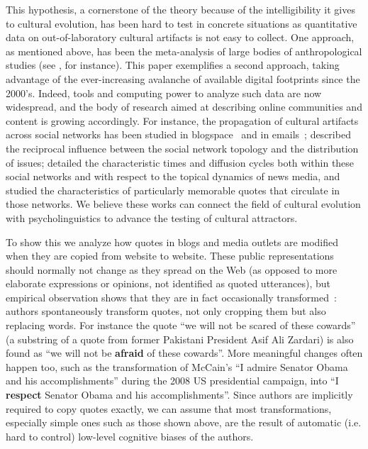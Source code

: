 \begin{new}
This hypothesis, a cornerstone of the theory because of the intelligibility it gives to cultural evolution, has been hard to test in concrete situations as quantitative data on out-of-laboratory cultural artifacts is not easy to collect.
One approach, as mentioned above, has been the meta-analysis of large bodies of anthropological studies (see \citealp{miton_universal_2015}, for instance).
This paper exemplifies a second approach, taking advantage of the ever-increasing avalanche of available digital footprints since the 2000's.
Indeed, tools and computing power to analyze such data are now widespread, and the body of research aimed at describing online communities and content is growing accordingly.
For instance, the propagation of cultural artifacts across social networks has been studied in blogspace~\citep{gruhl_information_2004} and in emails~\citep{liben-nowell_tracing_2008};
\citet{cointet_socio-semantic_2009} described the reciprocal influence between the social network topology and the distribution of issues;
\citet{leskovec_meme-tracking_2009} detailed the characteristic times and diffusion cycles both within these social networks and with respect to the topical dynamics of news media, and \citet{danescu-niculescu-mizil_you_2012} studied the characteristics of particularly memorable quotes that circulate in those networks.
We believe these works can connect the field of cultural evolution with psycholinguistics to advance the testing of cultural attractors.

\bigskip

To show this we analyze how quotes in blogs and media outlets are modified when they are copied from website to website.
These public representations should normally not change as they spread on the Web (as opposed to more elaborate expressions or opinions, not identified as quoted utterances), but empirical observation shows that they are in fact occasionally transformed~\citep{simmons_memes_2011}:
authors spontaneously transform quotes, not only cropping them but also replacing words.
For instance the quote ``we will not be scared of these cowards'' (a substring of a quote from former Pakistani President Asif Ali Zardari) is also found as ``we will not be \textbf{afraid} of these cowards''.
More meaningful changes often happen too, such as the transformation of McCain's ``I admire Senator Obama and his accomplishments'' during the 2008 US presidential campaign, into ``I \textbf{respect} Senator Obama and his accomplishments''.
Since authors are implicitly required to copy quotes exactly, we can assume that most transformations, especially simple ones such as those shown above, are the result of automatic (\hbox{i.e.} hard to control) low-level cognitive biases of the authors.


\end{new}
